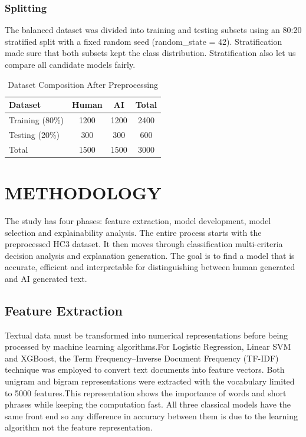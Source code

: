 \documentclass[conference]{IEEEtran}
\begin{document}
\subsubsection{Splitting}
The balanced dataset was divided into training and testing subsets using an 80:20 stratified split with a fixed random seed (random\_state = 42). Stratification made sure that both subsets kept the class distribution. Stratification also let us compare all candidate models fairly.
\begin{table}[htbp]
\caption{Dataset Composition After Preprocessing}
\label{tab:dataset}
\centering
\begin{tabular}{|l|c|c|c|}
\hline
\textbf{Dataset} & \textbf{Human} & \textbf{AI} & \textbf{Total} \\
\hline
Training (80\%) & 1200 & 1200 & 2400 \\
\hline
Testing (20\%) & 300 & 300 & 600 \\
\hline
Total & 1500 & 1500 & 3000 \\
\hline
\end{tabular}
\end{table}


\section{METHODOLOGY}



The study has four phases: feature extraction, model development, model selection and explainability analysis. The entire process starts with the preprocessed HC3 dataset. It then moves through classification multi-criteria decision analysis and explanation generation. The goal is to find a model that is accurate, efficient and interpretable for distinguishing between human generated and AI generated text.


\subsection{\textbf{Feature Extraction}}
Textual data must be transformed into numerical representations before being processed by machine learning algorithms.For Logistic Regression, Linear SVM and XGBoost, the Term Frequency–Inverse Document Frequency (TF-IDF) technique was employed to convert text documents into feature vectors. Both unigram and bigram representations were extracted with the vocabulary limited to 5000 features.This representation shows the importance of words and short phrases while keeping the computation fast. All three classical models have the same front end so any difference in accuracy between them is due to the learning algorithm not the feature representation.
\end{document}
